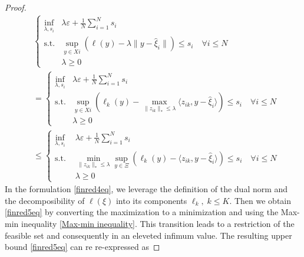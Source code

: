 \documentclass[11pt,a4paper,oneside,openany]{book}
\numberwithin{definition}{section}
\numberwithin{theorem}{section}
\numberwithin{problem}{section}
\begin{document}
\begin{proof}
\begin{align}
    &\left\{\begin{aligned}
        \inf_{\lambda, s_i} &\lambda \varepsilon + \frac{1}{N}\sum_{i=1}^N s_i \\
        \text{s.t.}& \sup_{y \in Xi}\left( \ell(y) - \lambda \| y - \hat \xi_i \|\right) \leq s_i \quad \forall i \leq N \\ & \lambda \geq 0
    \end{aligned}
    \right. \\ & = \label{finred4eq}
    \left\{\begin{aligned}
        \inf_{\lambda, s_i} &\lambda \varepsilon + \frac{1}{N}\sum_{i=1}^N s_i \\ 
        \text{s.t.}& \sup_{y \in Xi}\left( \ell_k(y) - \max_{\|z_{ik}\|_* \leq \lambda} \langle z_{ik},y - \hat \xi_i \rangle \right) \leq s_i \quad \forall i \leq N \\ &\lambda \geq 0
    \end{aligned}
    \right. \\
    \label{finred5eq}
    & \leq  \left\{
    \begin{aligned}
        \inf_{\lambda, s_i} &\lambda \varepsilon + \frac{1}{N}\sum_{i=1}^N s_i \\
        \text{s.t. } & \min_{\|z_{ik}\|_* \leq \lambda} \sup_{y \in \Xi}\left( \ell_k(y) - \langle z_{ik}, y - \hat \xi_i\rangle \right) \leq s_i \quad \forall i \leq N \\
        & \lambda \geq 0
    \end{aligned}
    \right.
\end{align}
In the formulation \eqref{finred4eq}, we leverage the definition of the dual norm and the decomposibility of $\ell(\xi)$ into its components $\ell_k,\; k \leq K$. Then we obtain \eqref{finred5eq} by converting the maximization to a minimization and using the Max-min inequality \eqref{Max-min inequality}. This transition leads to a restriction of the feasible set and consequently in an eleveted infimum value. The resulting upper bound \eqref{finred5eq} can re re-expressed as


\end{proof}
\end{document}
